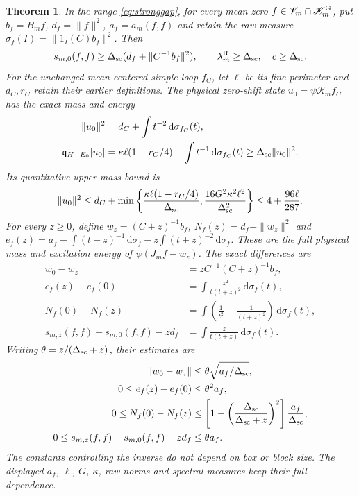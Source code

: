 \documentclass[11pt]{article}
\newtheorem{theorem}{Theorem}[section]
\newcommand{\dd}{\,\mathrm d}
\newcommand{\KK}{\mathscr K}
\newcommand{\VV}{\mathscr V}
\begin{document}
\begin{theorem}\label{thm:uniformzero}
In the range \eqref{eq:stronggap}, for every mean-zero
$f\in\VV_m\cap\KK_m^{\rm G}$, put $b_f=B_mf$,
$d_f=\|f\|^2$, $a_f=a_m(f,f)$ and retain the raw measure
$\sigma_f(I)=\|1_I(C)b_f\|^2$.
Then
\begin{equation}\label{eq:uniformzeroenergy}
 s_{m,0}(f,f)\geq\Delta_{\rm sc}
              (d_f+\|C^{-1}b_f\|^2),\qquad
 \lambda_m^{\rm R}\geq\Delta_{\rm sc},\quad c\geq\Delta_{\rm sc}.
\end{equation}
For the unchanged mean-centered simple loop $f_C$, let
$\ell$ be its fine perimeter and $d_C,r_C$ retain their earlier
definitions. The physical zero-shift state $u_0=\psi\mathcal R_m f_C$
has the exact mass and energy
\begin{align}
 \|u_0\|^2&=d_C+\int t^{-2}\dd\sigma_{f_C}(t),\label{eq:uniformloopmass}\\
 \mathfrak q_{H-E_0}[u_0]
 &=\kappa\ell(1-r_C/4)-\int t^{-1}\dd\sigma_{f_C}(t)
 \geq\Delta_{\rm sc}\|u_0\|^2.\label{eq:uniformloopenergy}
\end{align}
Its quantitative upper mass bound is
\begin{equation}\label{eq:uniformloopbound}
 \|u_0\|^2\leq d_C+
 \min\left\{\frac{\kappa\ell(1-r_C/4)}{\Delta_{\rm sc}},
             \frac{16G^2\kappa^2\ell^2}{\Delta_{\rm sc}^2}\right\}
 \leq4+\frac{96\ell}{287}.
\end{equation}
For every $z\geq0$, define $w_z=(C+z)^{-1}b_f$,
$N_f(z)=d_f+\|w_z\|^2$ and
$e_f(z)=a_f-\int(t+z)^{-1}\dd\sigma_f
                    -z\int(t+z)^{-2}\dd\sigma_f$.
These are the full physical mass and excitation energy of
$\psi(J_mf-w_z)$. The exact differences are
\begin{align}
 w_0-w_z&=zC^{-1}(C+z)^{-1}b_f,\label{eq:uniformwdiff}\\
 e_f(z)-e_f(0)&=\int\frac{z^2}{t(t+z)^2}\dd\sigma_f(t),
                                                        \label{eq:uniformediff}\\
 N_f(0)-N_f(z)&=\int\left(\frac1{t^2}-\frac1{(t+z)^2}\right)
                                      \dd\sigma_f(t),    \label{eq:uniformndiff}\\
 s_{m,z}(f,f)-s_{m,0}(f,f)-zd_f
 &=\int\frac{z}{t(t+z)}\dd\sigma_f(t).    \label{eq:uniformmemorydiff}
\end{align}
Writing $\theta=z/(\Delta_{\rm sc}+z)$, their estimates are
\begin{align}
 \|w_0-w_z\|&\leq\theta\sqrt{a_f/\Delta_{\rm sc}},\nonumber\\
 0\leq e_f(z)-e_f(0)&\leq\theta^2a_f,\nonumber\\
 0\leq N_f(0)-N_f(z)&\leq
 \left[1-\left(\frac{\Delta_{\rm sc}}{\Delta_{\rm sc}+z}\right)^2\right]
 \frac{a_f}{\Delta_{\rm sc}},\nonumber\\
 0\leq s_{m,z}(f,f)-s_{m,0}(f,f)-zd_f&\leq\theta a_f.
                                                        \label{eq:uniformcontinuity}
\end{align}
The constants controlling the inverse do not depend on box or block
size. The displayed $a_f$, $\ell$, $G$, $\kappa$, raw norms and
spectral measures keep their full dependence.
\end{theorem}
\end{document}
